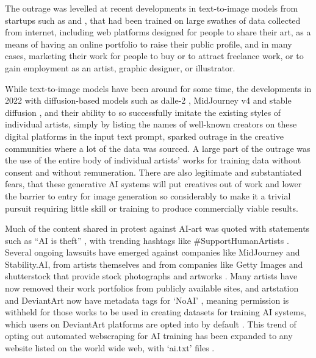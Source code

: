 The outrage was levelled at recent developments in text-to-image models from startups such as \cite{midjourney2023midjourney} and \cite{stability2023stability}, that had been trained on large swathes of data collected from internet, including web platforms designed for people to share their art, as a means of having an online portfolio to raise their public profile, and in many cases, marketing their work for people to buy or to attract freelance work, or to gain employment as an artist, graphic designer, or illustrator.

While text-to-image models have been around for some time, the developments in 2022 with diffusion-based models such as dalle-2 \citep{openai2022dalle2}, MidJourney v4 \citep{edwards2022midjourney} and stable diffusion \citep{stability2022stable}, and their ability to so successfully imitate the existing styles of individual artists, simply by listing the names of well-known creators on these digital platforms in the input text prompt, sparked outrage in the creative communities where a lot of the data was sourced. 
A large part of the outrage was the use of the entire body of individual artists' works for training data without consent and without remuneration.
There are also legitimate and substantiated fears, that these generative AI systems will put creatives out of work and lower the barrier to entry for image generation so considerably to make it a trivial pursuit requiring little skill or training to produce commercially viable results.

Much of the content shared in protest against AI-art was quoted with statements such as “AI is theft” \citep{whiddington2022backlash}, with trending hashtags like \#SupportHumanArtists \citep{zakuga2022theft}. 
Several ongoing lawsuits have emerged against companies like MidJourney and Stability.AI, from artists themselves \citep{brittain2023artists} and from companies like Getty Images and shutterstock that provide stock photographs and artworks \citep{vincent2023getty}. 
Many artists have now removed their work portfolios from publicly available sites, and artstation and DeviantArt now have metadata tags for ‘NoAI’ \citep{artstation2022noai}, meaning permission is withheld for those works to be used in creating datasets for training AI systems, which users on DeviantArt platforms are opted into by default \citep{deviantart2022optout}. 
This trend of opting out automated webscraping for AI training has been expanded to any website listed on the world wide web, with `ai.txt' files \citep{aitxt2024spawning}. 

